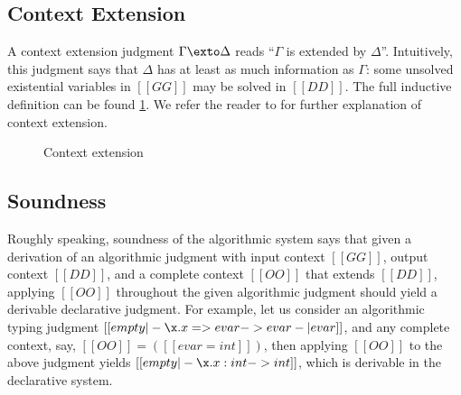 \subsection{Context Extension}
\label{sec:ctxt:extension}


A context extension judgment $\Gamma \exto \Delta$ reads ``$\Gamma$ is extended
by $\Delta$''. Intuitively, this judgment says that $\Delta$ has at least as
much information as $\Gamma$: some unsolved existential variables in $[[GG]]$
may be solved in $[[DD]]$. The full inductive definition can be found
\cref{fig:ctxt-extension}. We refer the reader to \citet[][Section
4]{dunfield2013complete} for further explanation of context extension.


\begin{figure}[t]
  \centering

  \begin{small}
  \end{small}
  

\caption{Context extension}
\label{fig:ctxt-extension}
\end{figure}




\subsection{Soundness}

Roughly speaking, soundness of the algorithmic system says
that given a derivation of an algorithmic judgment with input context
$[[GG]]$, output context $[[DD]]$, and a complete context $[[OO]]$
that extends $[[DD]]$, applying $[[OO]]$ throughout the given algorithmic judgment
should yield a derivable declarative judgment. For example, let us consider
an algorithmic typing judgment $[[ empty |- \x . x => evar -> evar -| evar  ]]$, and any complete context, say, $[[OO]] = ([[ evar = int ]])$,
then applying $[[OO]]$ to the above judgment yields $[[ empty |- \x . x : int -> int  ]]$, which is derivable in the declarative system.

